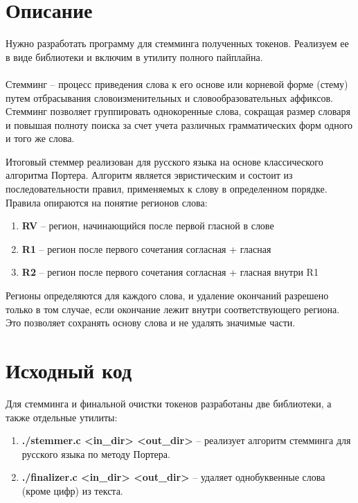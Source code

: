 \section{Описание}
Нужно разработать программу для стемминга полученных токенов. Реализуем ее в виде библиотеки и включим в утилиту полного пайплайна. \\ \\
Стемминг -- процесс приведения слова к его основе или корневой форме (стему) путем отбрасывания словоизменительных и словообразовательных аффиксов. Стемминг позволяет группировать однокоренные слова, сокращая размер словаря и повышая полноту поиска за счет учета различных грамматических форм одного и того же слова.

Итоговый стеммер реализован для русского языка на основе классического алгоритма Портера. Алгоритм является эвристическим и состоит из последовательности правил, применяемых к слову в определенном порядке. Правила опираются на понятие регионов слова:

\begin{enumerate}
    \item \textbf{RV} -- регион, начинающийся после первой гласной в слове
    \item \textbf{R1} -- регион после первого сочетания согласная + гласная
    \item \textbf{R2} -- регион после первого сочетания согласная + гласная внутри R1
\end{enumerate}

Регионы определяются для каждого слова, и удаление окончаний разрешено только в том случае, если окончание лежит внутри соответствующего региона. Это позволяет сохранять основу слова и не удалять значимые части.

\pagebreak

\section{Исходный код}
Для стемминга и финальной очистки токенов разработаны две библиотеки, а также отдельные утилиты:

\begin{enumerate}
    \item \textbf{./stemmer.c  <in\_dir> <out\_dir>} -- реализует алгоритм стемминга для русского языка по методу Портера.
    \item \textbf{./finalizer.c <in\_dir> <out\_dir>} -- удаляет однобуквенные слова (кроме цифр) из текста.
\end{enumerate}

